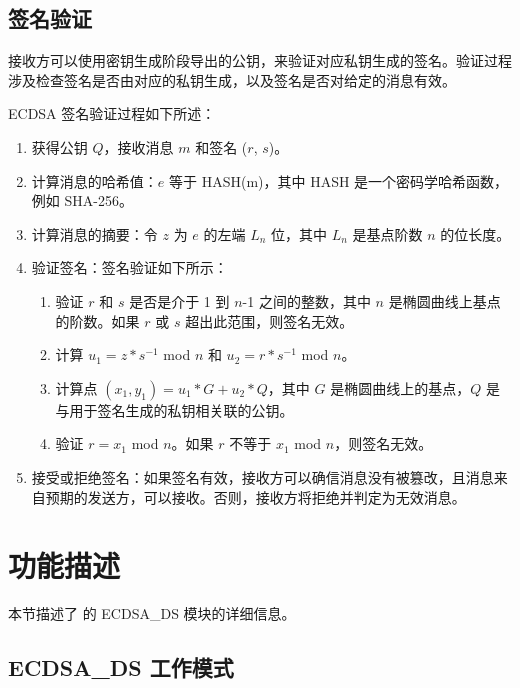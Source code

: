 \documentclass[main\_\_CN.tex]{subfiles}
\begin{document}
\subsection{签名验证}

接收方可以使用密钥生成阶段导出的公钥，来验证对应私钥生成的签名。验证过程涉及检查签名是否由对应的私钥生成，以及签名是否对给定的消息有效。

ECDSA 签名验证过程如下所述：

\begin{enumerate}
    \item 获得公钥 $Q$，接收消息 $m$ 和签名 ($r$, $s$)。
    \item 计算消息的哈希值：$e$ 等于 HASH(m)，其中 HASH 是一个密码学哈希函数，例如 SHA-256。
    \item 计算消息的摘要：令 $z$ 为 $e$ 的左端 $L_n$ 位，其中 $L_n$ 是基点阶数 $n$ 的位长度。
    \item 验证签名：签名验证如下所示：
        \begin{enumerate}
            \item 验证 $r$ 和 $s$ 是否是介于 1 到 $n$-1 之间的整数，其中 $n$ 是椭圆曲线上基点的阶数。如果 $r$ 或 $s$ 超出此范围，则签名无效。
            \item 计算 $u_1 = z * s^{-1}$ \textrm{mod} $n$ 和 $u_2 = r * s^{-1}$ \textrm{mod} $n$。
            \item 计算点 $(x_1, y_1) = u_1 * G + u_2 * Q$，其中 $G$ 是椭圆曲线上的基点，$Q$ 是与用于签名生成的私钥相关联的公钥。
            \item 验证 $r = x_1$ \textrm{mod} $n$。如果 $r$ 不等于 $x_1$ \textrm{mod} $n$，则签名无效。
        \end{enumerate}
    \item 接受或拒绝签名：如果签名有效，接收方可以确信消息没有被篡改，且消息来自预期的发送方，可以接收。否则，接收方将拒绝并判定为无效消息。
\end{enumerate}



\section{功能描述}

本节描述了 \chipname{} 的 ECDSA\_DS 模块的详细信息。

\subsection{ECDSA\_DS 工作模式}
\end{document}
